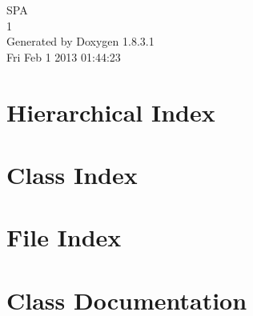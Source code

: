 \documentclass{book}
\begin{document}
\hypersetup{pageanchor=false,citecolor=blue}
\begin{titlepage}
\vspace*{7cm}
\begin{center}
{\Large S\-P\-A \\[1ex]\large 1 }\\
\vspace*{1cm}
{\large Generated by Doxygen 1.8.3.1}\\
\vspace*{0.5cm}
{\small Fri Feb 1 2013 01:44:23}\\
\end{center}
\end{titlepage}
\clearemptydoublepage
{}
\tableofcontents
\clearemptydoublepage
{}
\hypersetup{pageanchor=true,citecolor=blue}
\chapter{Hierarchical Index}

\chapter{Class Index}

\chapter{File Index}

\chapter{Class Documentation}


























\end{document}
